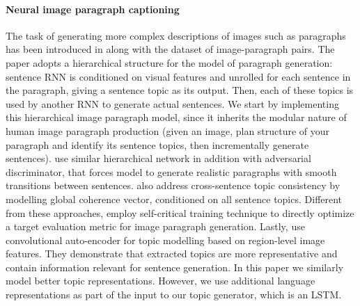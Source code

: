 \documentclass[11pt,a4paper]{article}
\begin{document}
\paragraph{Neural image paragraph captioning}
The task of generating more complex descriptions of images such as paragraphs has been introduced in  along with the dataset of image-paragraph pairs.
The paper adopts a hierarchical structure for the model of paragraph generation: sentence RNN is conditioned on visual features and unrolled for each sentence in the paragraph, giving a sentence topic as its output.
Then, each of these topics is used by another RNN to generate actual sentences.
We start by implementing this hierarchical image paragraph model, since it inherits the modular nature of human image paragraph production (given an image, plan structure of your paragraph and identify its sentence topics, then incrementally generate sentences). %
 use similar hierarchical network in addition with adversarial discriminator, that forces model to generate realistic paragraphs with smooth transitions between sentences.
 also address cross-sentence topic consistency by modelling global coherence vector, conditioned on all sentence topics.
Different from these approaches,  employ self-critical training technique \cite{selfcritical2016} to directly optimize a target evaluation metric for image paragraph generation.
Lastly,  use convolutional auto-encoder for topic modelling based on region-level image features. They demonstrate that extracted topics are more representative and contain information relevant for sentence generation.
In this paper we similarly model better topic representations. However, we use additional language representations as part of the input to our topic generator, which is an LSTM.
\end{document}
